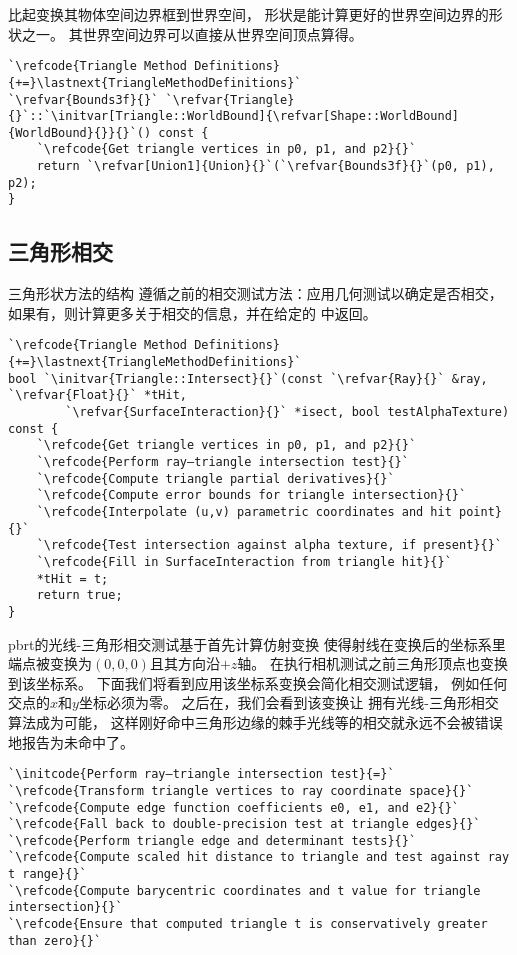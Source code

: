 比起变换其物体空间边界框到世界空间，
形状是能计算更好的世界空间边界的形状之一。
其世界空间边界可以直接从世界空间顶点算得。
\begin{lstlisting}
`\refcode{Triangle Method Definitions}{+=}\lastnext{TriangleMethodDefinitions}`
`\refvar{Bounds3f}{}` `\refvar{Triangle}{}`::`\initvar[Triangle::WorldBound]{\refvar[Shape::WorldBound]{WorldBound}{}}{}`() const {
    `\refcode{Get triangle vertices in p0, p1, and p2}{}`
    return `\refvar[Union1]{Union}{}`(`\refvar{Bounds3f}{}`(p0, p1), p2); 
}
\end{lstlisting}

\subsection{三角形相交}\label{sub:三角形相交}
三角形状方法的结构
遵循之前的相交测试方法：应用几何测试以确定是否相交，
如果有，则计算更多关于相交的信息，并在给定的
中返回。
\begin{lstlisting}
`\refcode{Triangle Method Definitions}{+=}\lastnext{TriangleMethodDefinitions}`
bool `\initvar{Triangle::Intersect}{}`(const `\refvar{Ray}{}` &ray, `\refvar{Float}{}` *tHit,
        `\refvar{SurfaceInteraction}{}` *isect, bool testAlphaTexture) const {
    `\refcode{Get triangle vertices in p0, p1, and p2}{}`
    `\refcode{Perform ray–triangle intersection test}{}`
    `\refcode{Compute triangle partial derivatives}{}`
    `\refcode{Compute error bounds for triangle intersection}{}`
    `\refcode{Interpolate (u,v) parametric coordinates and hit point}{}`
    `\refcode{Test intersection against alpha texture, if present}{}`
    `\refcode{Fill in SurfaceInteraction from triangle hit}{}`
    *tHit = t;
    return true;
}
\end{lstlisting}

pbrt的光线-三角形相交测试基于首先计算仿射变换
使得射线在变换后的坐标系里端点被变换为$(0,0,0)$且其方向沿$+z$轴。
在执行相机测试之前三角形顶点也变换到该坐标系。
下面我们将看到应用该坐标系变换会简化相交测试逻辑，
例如任何交点的$x$和$y$坐标必须为零。
之后在，我们会看到该变换让
拥有光线-三角形相交算法成为可能，
这样刚好命中三角形边缘的棘手光线等的相交就永远不会被错误地报告为未命中了。
\begin{lstlisting}
`\initcode{Perform ray–triangle intersection test}{=}`
`\refcode{Transform triangle vertices to ray coordinate space}{}`
`\refcode{Compute edge function coefficients e0, e1, and e2}{}`
`\refcode{Fall back to double-precision test at triangle edges}{}`
`\refcode{Perform triangle edge and determinant tests}{}`
`\refcode{Compute scaled hit distance to triangle and test against ray t range}{}`
`\refcode{Compute barycentric coordinates and t value for triangle intersection}{}`
`\refcode{Ensure that computed triangle t is conservatively greater than zero}{}`
\end{lstlisting}

